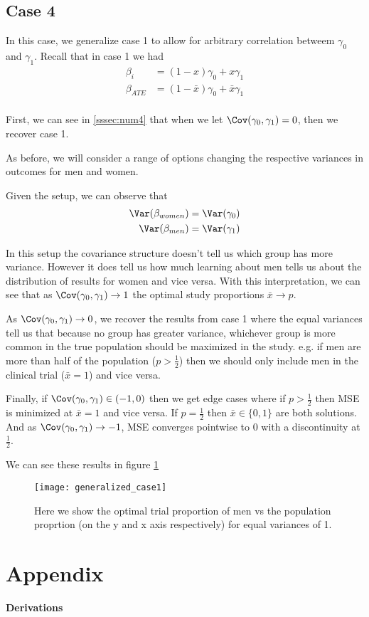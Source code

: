 \subsection*{Case 4}

In this case, we generalize case 1 to allow for arbitrary correlation betweem $\gamma_0$ and $\gamma_1$.
Recall that in case 1 we had
\begin{align*}
	\beta_i &=  (1-x)\gamma_0 + x \gamma_1 \\
	\beta_{ATE} &=  (1 - \bar{x})\gamma_0 + \bar{x} \gamma_1 \\
\end{align*}


First, we can see in \ref{sssec:num4} that when we let  $\Cov(\gamma_0, \gamma_1) = 0$, then we recover case 1.

As before, we will consider a range of options changing the respective variances in outcomes for men and women.

Given the setup, we can observe that
\begin{align*}
	\Var(\beta_{women}) &= \Var(\gamma_0) \\
	\Var(\beta_{men}) &= \Var(\gamma_1)
\end{align*} 

In this setup the covariance structure doesn't tell us which group has more variance. However it does tell us how much learning about men tells us about the distribution of results for women and vice versa. 
With this interpretation, we can see that as $\Cov(\gamma_0, \gamma_1) \to 1$ the optimal study proportions $\bar{x} \to p$.

As  $\Cov(\gamma_0, \gamma_1) \to 0$, we recover the results from case 1 where the equal variances tell us that because no group has greater variance, whichever group is more common in the true population should be maximized in the study.  e.g. if men are more than half of the population ($p >  \frac{1}{2}$) then we should only include men in the clinical trial ($\bar{x} = 1$) and vice versa.

Finally, if $\Cov(\gamma_0, \gamma_1) \in (-1,0)$ then we get edge cases where if $p > \frac{1}{2}$ then MSE is minimized at $\bar{x} = 1$ and vice versa. If $p=\frac{1}{2}$ then $\bar{x} \in \{0,1\}$ are both solutions. And as $\Cov(\gamma_0, \gamma_1) \to -1$, MSE converges pointwise to 0 with a discontinuity at $\frac{1}{2}$.

We can see these results in figure \ref{fig:generalized_case1}

\begin{figure}[ht!]
  \centering
	\texttt{[image: generalized\_case1]}
	\caption{Here we show the optimal trial proportion of men vs the population proprtion (on the y and x axis respectively) for equal variances of 1.} 
	\label{fig:generalized_case1}
\end{figure}


\section{Appendix}

\begin{center}
	{\large \bf Derivations }
\end{center}










